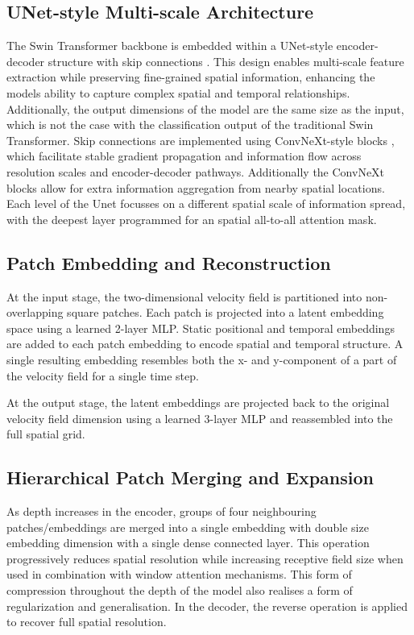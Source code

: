 \subsection{UNet-style Multi-scale Architecture}

The Swin Transformer backbone is embedded within a UNet-style encoder-decoder structure with skip connections \cite{ronneberger2015unet}. This design enables multi-scale feature extraction while preserving fine-grained spatial information, enhancing the models ability to capture complex spatial and temporal relationships. Additionally, the output dimensions of the model are the same size as the input, which is not the case with the classification output of the traditional Swin Transformer. Skip connections are implemented using ConvNeXt-style blocks \cite{Liu2022ConvNeXt}, which facilitate stable gradient propagation and information flow across resolution scales and encoder-decoder pathways. Additionally the ConvNeXt blocks allow for extra information aggregation from nearby spatial locations. Each level of the Unet focusses on a different spatial scale of information spread, with the deepest layer programmed for an spatial all-to-all attention mask.  


\subsection{Patch Embedding and Reconstruction}

At the input stage, the two-dimensional velocity field is partitioned into non-overlapping square patches. Each patch is projected into a latent embedding space using a learned 2-layer MLP. Static positional and temporal embeddings are added to each patch embedding to encode spatial and temporal structure. A single resulting embedding resembles both the x- and y-component of a part of the velocity field for a single time step.

At the output stage, the latent embeddings are projected back to the original velocity field dimension using a learned 3-layer MLP and reassembled into the full spatial grid.

\subsection{Hierarchical Patch Merging and Expansion}

As depth increases in the encoder, groups of four neighbouring patches/embeddings are merged into a single embedding with double size embedding dimension with a single dense connected layer. This operation progressively reduces spatial resolution while increasing receptive field size when used in combination with window attention mechanisms. This form of compression throughout the depth of the model also realises a form of regularization and generalisation. In the decoder, the reverse operation is applied to recover full spatial resolution.

